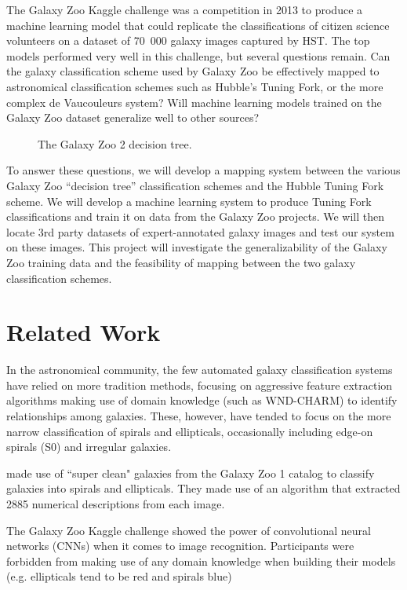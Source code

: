 \documentclass[twocolumn]{aastex6}
\begin{document}
The Galaxy Zoo Kaggle challenge was a competition in 2013 to produce a machine learning model that could replicate the classifications of citizen science volunteers on a dataset of 70 000 galaxy images captured by HST. The top models performed very well in this challenge, but several questions remain. Can the galaxy classification scheme used by Galaxy Zoo be effectively mapped to astronomical classification schemes such as Hubble's Tuning Fork, or the more complex de Vaucouleurs system? Will machine learning models trained on the Galaxy Zoo dataset generalize well to other sources? 

\begin{figure}[!b]
\caption{The Galaxy Zoo 2 decision tree.}
\label{fig:GZ2tree}
\end{figure}

To answer these questions, we will develop a mapping system between the various Galaxy Zoo “decision tree” classification schemes and the Hubble Tuning Fork scheme. We will develop a machine learning system to produce Tuning Fork classifications and train it on data from the Galaxy Zoo projects. We will then locate 3rd party datasets of expert-annotated galaxy images and test our system on these images. This project will investigate the generalizability of the Galaxy Zoo training data and the feasibility of mapping between the two galaxy classification schemes. 

\section{Related Work}
In the astronomical community, the few automated galaxy classification systems have relied on more tradition methods, focusing on aggressive feature extraction algorithms making use of domain knowledge (such as WND-CHARM) to identify relationships among galaxies. These, however, have tended to focus on the more narrow classification of spirals and ellipticals, occasionally including edge-on spirals (S0) and irregular galaxies.

\cite{2016ApJS..223...20K} made use of ``super clean" galaxies from the Galaxy Zoo 1 catalog \citep{2008MNRAS.389.1179L} to classify galaxies into spirals and ellipticals. They made use of an algorithm that extracted 2885 numerical descriptions from each image.

The Galaxy Zoo Kaggle challenge showed the power of convolutional neural networks (CNNs) when it comes to image recognition. Participants were forbidden from making use of any domain knowledge when building their models (e.g. ellipticals tend to be red and spirals blue)
\end{document}
